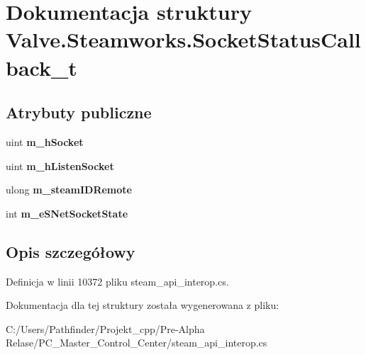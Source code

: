 \hypertarget{struct_valve_1_1_steamworks_1_1_socket_status_callback__t}{}\section{Dokumentacja struktury Valve.\+Steamworks.\+Socket\+Status\+Callback\+\_\+t}
\label{struct_valve_1_1_steamworks_1_1_socket_status_callback__t}
\subsection*{Atrybuty publiczne}
\begin{DoxyCompactItemize}
\item 
\mbox{\label{struct_valve_1_1_steamworks_1_1_socket_status_callback__t_a1a533a07b392f73dfe8f30f079d52f16}} 
uint {\bfseries m\+\_\+h\+Socket}
\item 
\mbox{\label{struct_valve_1_1_steamworks_1_1_socket_status_callback__t_a4b9afa708cc7c383b525db6d291c1a03}} 
uint {\bfseries m\+\_\+h\+Listen\+Socket}
\item 
\mbox{\label{struct_valve_1_1_steamworks_1_1_socket_status_callback__t_a4459d89fdbb738b7ba712f0139f4fb19}} 
ulong {\bfseries m\+\_\+steam\+I\+D\+Remote}
\item 
\mbox{\label{struct_valve_1_1_steamworks_1_1_socket_status_callback__t_a12ce0a70896f2b367e52ce44f259cd8a}} 
int {\bfseries m\+\_\+e\+S\+Net\+Socket\+State}
\end{DoxyCompactItemize}


\subsection{Opis szczegółowy}


Definicja w linii 10372 pliku steam\+\_\+api\+\_\+interop.\+cs.



Dokumentacja dla tej struktury została wygenerowana z pliku\+:\begin{DoxyCompactItemize}
\item 
C\+:/\+Users/\+Pathfinder/\+Projekt\+\_\+cpp/\+Pre-\/\+Alpha Relase/\+P\+C\+\_\+\+Master\+\_\+\+Control\+\_\+\+Center/steam\+\_\+api\+\_\+interop.\+cs\end{DoxyCompactItemize}
